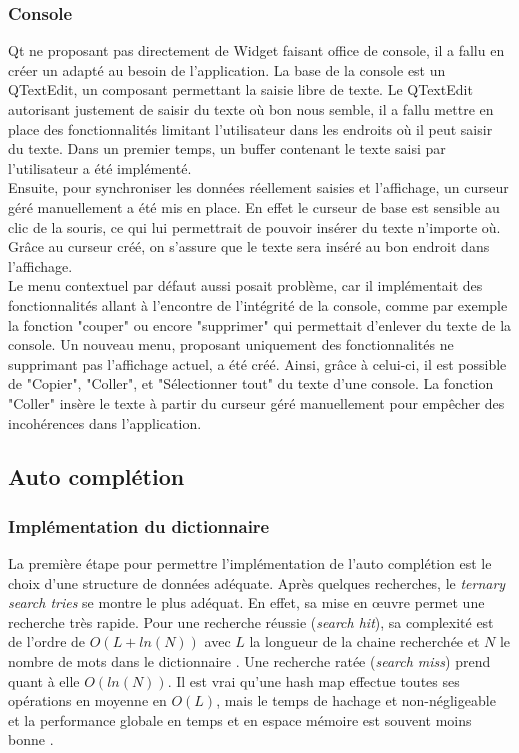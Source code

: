 \documentclass[french]{article}
\begin{document}
			\subsubsection{Console}
				Qt ne proposant pas directement de Widget faisant office de console, il a fallu en créer un adapté au besoin de l'application. La base de la console est un QTextEdit, un composant permettant la saisie libre de texte. Le QTextEdit autorisant justement de saisir du texte où bon nous semble, il a fallu mettre en place des fonctionnalités limitant l'utilisateur dans les endroits où il peut saisir du texte. Dans un premier temps, un buffer contenant le texte saisi par l'utilisateur a été implémenté.\\
				Ensuite, pour synchroniser les données réellement saisies et l'affichage, un curseur géré manuellement a été mis en place. En effet le curseur de base est sensible au clic de la souris, ce qui lui permettrait de pouvoir insérer du texte n'importe où. Grâce au curseur créé, on s'assure que le texte sera inséré au bon endroit dans l'affichage.\\
				Le menu contextuel par défaut aussi posait problème, car il implémentait des fonctionnalités allant à l'encontre de l'intégrité de la console, comme par exemple la fonction "couper" ou encore "supprimer" qui permettait d'enlever du texte de la console. Un nouveau menu, proposant uniquement des fonctionnalités ne supprimant pas l'affichage actuel, a été créé. Ainsi, grâce à celui-ci, il est possible de "Copier", "Coller", et "Sélectionner tout" du texte d'une console. La fonction "Coller" insère le texte à partir du curseur géré manuellement pour empêcher des incohérences dans l'application.
		\subsection{Auto complétion}
			\subsubsection{Implémentation du dictionnaire}
			La première étape pour permettre l'implémentation de l'auto complétion est le choix d'une structure de données adéquate. Après quelques recherches, le \textit{ternary search tries} se montre le plus adéquat. En effet, sa mise en œuvre permet une recherche très rapide. Pour une recherche réussie (\textit{search hit}), sa complexité est de l'ordre de $O(L + ln(N))$ avec $L$ la longueur de la chaine recherchée et $N$ le nombre de mots dans le dictionnaire \cite{tries}. Une recherche ratée (\textit{search miss}) prend quant à elle $O(ln(N))$. Il est vrai qu'une hash map effectue toutes ses opérations en moyenne en $O(L)$, mais le temps de hachage et non-négligeable et la performance globale en temps et en espace mémoire est souvent moins bonne \cite{sedgewick}.
			
\end{document}
